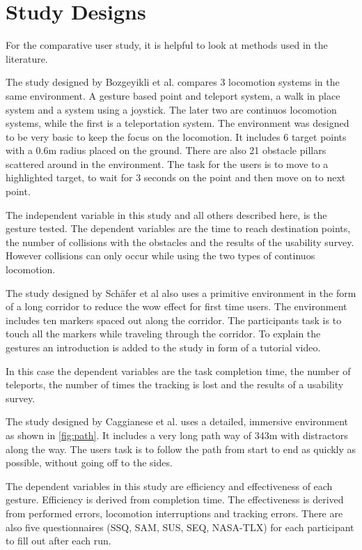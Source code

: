 \section{Study Designs}
For the comparative user study, it is helpful to look at methods used in the literature. 


The study designed by Bozgeyikli et al. \cite{bozgeyikli} compares 3 locomotion systems in the same environment. A gesture based point and teleport system, a walk in place system and a system using a joystick. The later two are continuos locomotion systems, while the first is a teleportation system. The environment was designed to be very basic to keep the focus on the locomotion. It includes 6 target points with a 0.6m radius placed on the ground. There are also 21 obstacle pillars scattered around in the environment. The task for the users is to move to a highlighted target, to wait for 3 seconds on the point and then move on to next point.

The independent variable in this study and all others described here, is the gesture tested. The dependent variables are the time to reach destination points, the number of collisions with the obstacles and the results of the usability survey. 
However collisions can only occur while using the two types of continuos locomotion. 



The study designed by Schäfer et al \cite{Schafer2021} also uses a primitive environment in the form of a long corridor to reduce the wow effect for first time users. The environment includes ten markers spaced out along the corridor. The participants task is to touch all the markers while traveling through the corridor. To explain the gestures an introduction is added to the study in form of a tutorial video.

In this case the dependent variables are the task completion time, the number of teleports, the number of times the tracking is lost and the results of a usability survey.


The study designed by Caggianese et al. \cite{Caggianese} uses a detailed, immersive environment as shown in \ref{fig:path}. It includes a very long path way of 343m with distractors along the way. The users task is to follow the path from start to end as quickly as possible, without going off to the sides.

The dependent variables in this study are efficiency and effectiveness of each gesture. Efficiency is derived from completion time. The effectiveness is derived from performed errors, locomotion interruptions and tracking errors. There are also five questionnaires (SSQ, SAM, SUS, SEQ, NASA-TLX) for each participant to fill out after each run.

